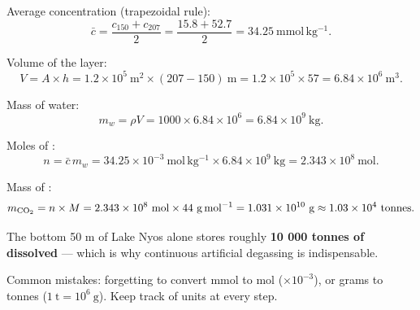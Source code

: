 \documentclass[11pt]{article}
\begin{document}
\begin{corrige}
Average concentration (trapezoidal rule):
\[ \bar{c} = \frac{c_{150} + c_{207}}{2} = \frac{15.8 + 52.7}{2} = 34.25\ \mathrm{mmol\,kg^{-1}}. \]

Volume of the layer:
\[ V = A \times h = 1.2\times 10^{5}\ \mathrm{m^2} \times (207-150)\ \mathrm{m} = 1.2\times 10^{5} \times 57 = 6.84\times 10^{6}\ \mathrm{m^3}. \]

Mass of water:
\[ m_{w} = \rho V = 1000 \times 6.84\times 10^{6} = 6.84\times 10^{9}\ \mathrm{kg}. \]

Moles of :
\[ n = \bar{c}\, m_{w} = 34.25\times 10^{-3}\ \mathrm{mol\,kg^{-1}} \times 6.84\times 10^{9}\ \mathrm{kg} = 2.343\times 10^{8}\ \mathrm{mol}. \]

Mass of :
\[ m_{\ce{CO2}} = n \times M = 2.343\times 10^{8}\ \mathrm{mol} \times 44\ \mathrm{g\,mol^{-1}} = 1.031\times 10^{10}\ \mathrm{g} \approx 1.03\times 10^{4}\ \mathrm{tonnes}. \]

\begin{aretenir}
The bottom 50 m of Lake Nyos alone stores roughly \textbf{10 000 tonnes of dissolved } — which is why continuous artificial degassing is indispensable.
\end{aretenir}

\begin{attention}
Common mistakes: forgetting to convert mmol to mol ($\times 10^{-3}$), or grams to tonnes ($1\ \mathrm{t} = 10^{6}\ \mathrm{g}$). Keep track of units at every step.
\end{attention}
\end{corrige}
\end{document}

